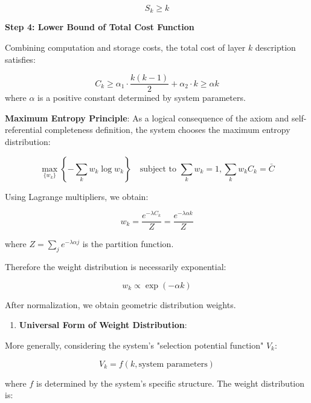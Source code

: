 \begin{equation}
S_k \geq k
\end{equation}

   \textbf{Step 4: Lower Bound of Total Cost Function}
   
   Combining computation and storage costs, the total cost of layer $k$ description satisfies:
   
\begin{equation}
C_k \geq \alpha_1 \cdot \frac{k(k-1)}{2} + \alpha_2 \cdot k \geq \alpha k
\end{equation}
   where $\alpha$ is a positive constant determined by system parameters.
   
   \textbf{Maximum Entropy Principle}: As a logical consequence of the axiom and self-referential completeness definition, the system chooses the maximum entropy distribution:
   
\begin{equation}
\max_{\{w_k\}} \left\{ -\sum_k w_k \log w_k \right\} \quad \text{subject to } \sum_k w_k = 1, \sum_k w_k C_k = \bar{C}
\end{equation}
   
   Using Lagrange multipliers, we obtain:
   
\begin{equation}
w_k = \frac{e^{-\lambda C_k}}{Z} = \frac{e^{-\lambda \alpha k}}{Z}
\end{equation}
   
   where $Z = \sum_j e^{-\lambda \alpha j}$ is the partition function.
   
   Therefore the weight distribution is necessarily exponential:
   
\begin{equation}
w_k \propto \exp(-\alpha k)
\end{equation}
   
   After normalization, we obtain geometric distribution weights.

\begin{enumerate}
\item \textbf{Universal Form of Weight Distribution}:
\end{enumerate}
   
   More generally, considering the system's "selection potential function" $V_k$:
   
\begin{equation}
V_k = f(k, \text{system parameters})
\end{equation}
   
   where $f$ is determined by the system's specific structure. The weight distribution is:
   
